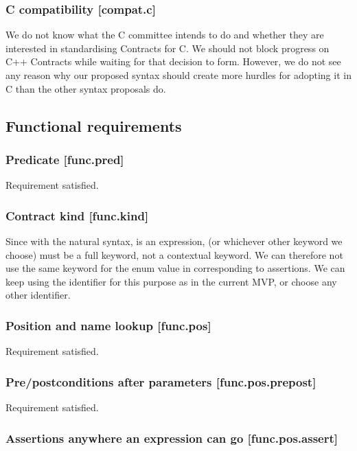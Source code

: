 \subsubsection{C compatibility  [compat.c]}

We do not know what the C committee intends to do and whether they are interested in standardising Contracts for C. We should not block progress on C++ Contracts while waiting for that decision to form. However, we do not see any reason why our proposed syntax should create more hurdles for adopting it in C than the other syntax proposals do.

\subsection{Functional requirements}

\subsubsection{Predicate  [func.pred]}

Requirement satisfied.

\subsubsection{Contract kind  [func.kind]}

Since with the natural syntax,  is an expression,  (or whichever other keyword we choose) must be a full keyword, not a contextual keyword. We can therefore not use the same keyword for the enum value in  corresponding to assertions. We can keep using the identifier  for this purpose as in the current MVP, or choose any other identifier.

\subsubsection{Position and name lookup [func.pos]}

Requirement satisfied.

\subsubsection{Pre/postconditions after parameters [func.pos.prepost]}

Requirement satisfied.

\subsubsection{Assertions anywhere an expression can go [func.pos.assert]}

